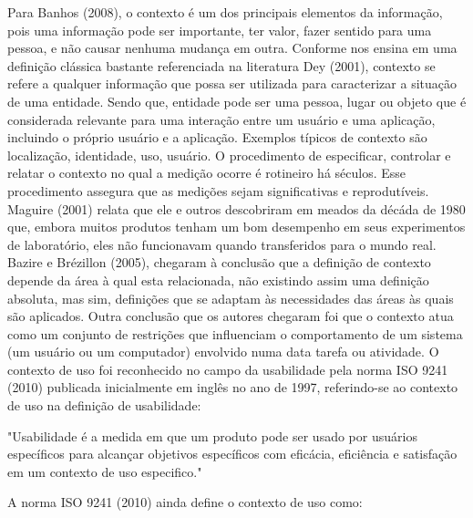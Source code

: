 Para Banhos (2008), o contexto é um dos principais elementos da informação, pois uma informação pode ser importante, ter valor, fazer sentido para uma pessoa, e não causar nenhuma mudança em outra. Conforme nos ensina em uma definição clássica bastante referenciada na literatura Dey (2001), contexto se refere a qualquer informação que possa ser utilizada para caracterizar a situação de uma entidade. Sendo que, entidade pode ser uma pessoa, lugar ou objeto que é considerada relevante para uma interação entre um usuário e uma aplicação, incluindo o próprio usuário e a aplicação. Exemplos típicos de contexto são localização, identidade, uso, usuário.\newline
\indent O procedimento de especificar, controlar e relatar o contexto no qual a medição ocorre é rotineiro há séculos. Esse procedimento assegura que as medições sejam significativas e reprodutíveis. Maguire (2001)  relata que ele e outros descobriram em meados da décáda de 1980 que, embora muitos produtos tenham um bom desempenho em seus experimentos de laboratório, eles não funcionavam quando transferidos para o mundo real.\newline
\indent Bazire e Brézillon (2005), chegaram à conclusão que a definição de contexto depende da área à qual esta relacionada, não existindo assim uma definição absoluta, mas sim, definições que se adaptam às necessidades das áreas às quais são aplicados. Outra conclusão que os autores chegaram foi que o contexto atua como um conjunto de restrições que influenciam o comportamento de um sistema (um usuário ou um computador) envolvido numa data tarefa ou atividade.\newline
\indent O contexto de uso foi reconhecido no campo da usabilidade pela norma ISO 9241 (2010) publicada inicialmente em inglês no ano de 1997, referindo-se ao contexto de uso na definição de usabilidade:\newline

	{\raggedleft
	\hspace*{4.5cm} 
	\begin{minipage}{0.7\textwidth} 
		"Usabilidade é a medida em que um produto pode ser usado por usuários específicos para alcançar objetivos específicos com eficácia, eficiência e satisfação em um contexto de uso especifico."	
		\newline	
	\end{minipage}
	\newline	
	\par}

\indent A norma ISO 9241 (2010) ainda define o contexto de uso como: \newline

